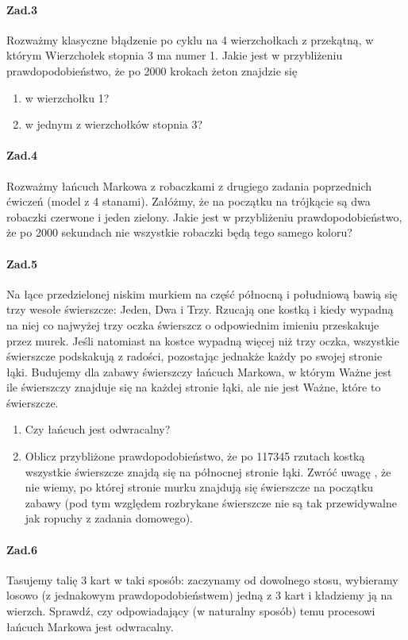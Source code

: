 \documentclass[a4paper,12pt]{article}
\theoremstyle{definition}%
\theoremstyle{definition}
\theoremstyle{problem}
\begin{document}
\paragraph{Zad.3} Rozważmy klasyczne błądzenie po cyklu na 4 wierzchołkach z przekątną, w którym Wierzchołek stopnia 3 ma numer 1. Jakie jest w przybliżeniu prawdopodobieństwo, że po 2000 krokach żeton znajdzie się
\begin{enumerate}[label=\alph*)]
\item w wierzchołku 1?
\item w jednym z wierzchołków stopnia 3?
\end{enumerate}

\paragraph{Zad.4} Rozważmy łańcuch Markowa z robaczkami z drugiego zadania poprzednich ćwiczeń (model z 4 stanami). Załóżmy, że na początku na trójkącie są dwa robaczki czerwone i jeden zielony. Jakie jest w przybliżeniu prawdopodobieństwo, że po 2000 sekundach nie wszystkie robaczki będą tego samego koloru?

\paragraph{Zad.5} Na łące przedzielonej niskim murkiem na część północną i południową bawią się trzy wesołe świerszcze: Jeden, Dwa i Trzy. Rzucają one kostką i kiedy wypadną na niej co najwyżej trzy oczka świerszcz o odpowiednim imieniu przeskakuje przez murek. Jeśli natomiast na kostce wypadną więcej niż trzy oczka, wszystkie świerszcze podskakują z radości, pozostając jednakże każdy po swojej stronie łąki. Budujemy dla zabawy świerszczy łańcuch Markowa, w którym Ważne jest ile świerszczy znajduje się na każdej stronie łąki, ale nie jest Ważne, które to świerszcze.
\begin{enumerate}[label=\alph*)]
\item Czy łańcuch jest odwracalny?
\item Oblicz przybliżone prawdopodobieństwo, że po 117345 rzutach kostką wszystkie świerszcze znajdą się na północnej stronie łąki. Zwróć uwagę , że nie wiemy, po której stronie murku znajdują się świerszcze na początku zabawy (pod tym względem rozbrykane świerszcze nie są tak przewidywalne jak ropuchy z zadania domowego).
\end{enumerate}

\paragraph{Zad.6} Tasujemy talię 3 kart w taki sposób: zaczynamy od dowolnego stosu, wybieramy losowo (z jednakowym prawdopodobieństwem) jedną z 3 kart i kładziemy ją na wierzch. Sprawdź, czy odpowiadający (w naturalny sposób) temu procesowi łańcuch Markowa jest odwracalny.
\end{document}
